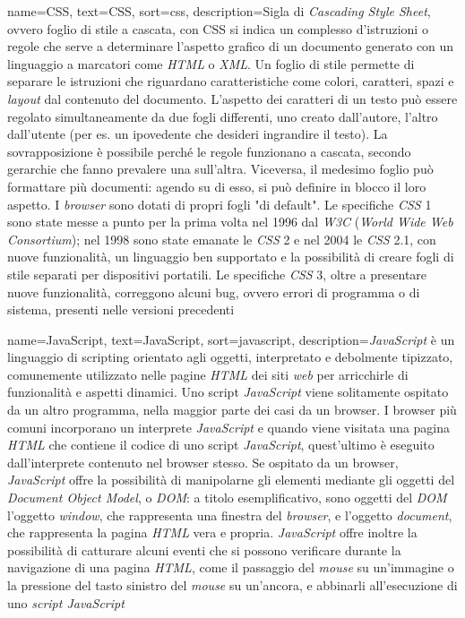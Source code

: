  {
    name=CSS,
    text=CSS,
    sort=css,
    description={Sigla di \emph{Cascading Style Sheet}, ovvero foglio di stile a cascata, con CSS si indica un complesso d'istruzioni o regole che serve a determinare l’aspetto grafico di un documento generato con un linguaggio a marcatori come \emph{HTML} o \emph{XML}. 
    Un foglio di stile permette di separare le istruzioni che riguardano caratteristiche come colori, caratteri, spazi e \emph{layout} dal contenuto del documento. 
    L’aspetto dei caratteri di un testo può essere regolato simultaneamente da due fogli differenti, uno creato dall’autore, l’altro dall’utente (per es. un ipovedente che desideri ingrandire il testo). 
    La sovrapposizione è possibile perché le regole funzionano a cascata, secondo gerarchie che fanno prevalere una sull’altra. 
    Viceversa, il medesimo foglio può formattare più documenti: agendo su di esso, si può definire in blocco il loro aspetto. 
    I \emph{browser} sono dotati di propri fogli "di default". 
    Le specifiche \emph{CSS} 1 sono state messe a punto per la prima volta nel 1996 dal \emph{W3C} (\emph{World Wide Web Consortium}); nel 1998 sono state emanate le \emph{CSS} 2 e nel 2004 le \emph{CSS} 2.1, con nuove funzionalità, un linguaggio ben supportato e la possibilità di creare fogli di stile separati per dispositivi portatili. 
    Le specifiche \emph{CSS} 3, oltre a presentare nuove funzionalità, correggono alcuni bug, ovvero errori di programma o di sistema, presenti nelle versioni precedenti}
}

 {
    name=JavaScript,
    text=JavaScript,
    sort=javascript,
    description={\emph{JavaScript} è un linguaggio di scripting orientato agli oggetti, interpretato e debolmente tipizzato, comunemente utilizzato nelle pagine \emph{HTML} dei siti \emph{web} per arricchirle di funzionalità e aspetti dinamici. 
    Uno script \emph{JavaScript} viene solitamente ospitato da un altro programma, nella maggior parte dei casi da un browser. 
    I browser più comuni incorporano un interprete \emph{JavaScript} e quando viene visitata una pagina \emph{HTML} che contiene il codice di uno script \emph{JavaScript}, quest'ultimo è eseguito dall’interprete contenuto nel browser stesso.  
    Se ospitato da un browser, \emph{JavaScript} offre la possibilità di manipolarne gli elementi mediante gli oggetti del \emph{Document Object Model}, o \emph{DOM}: a titolo esemplificativo, sono oggetti del \emph{DOM} l’oggetto \emph{window}, che rappresenta una finestra del \emph{browser}, e l’oggetto \emph{document}, che rappresenta la pagina \emph{HTML} vera e propria. 
    \emph{JavaScript} offre inoltre la possibilità di catturare alcuni eventi che si possono verificare durante la navigazione di una pagina \emph{HTML}, come il passaggio del \emph{mouse} su un’immagine o la pressione del tasto sinistro del \emph{mouse} su un’ancora, e abbinarli all’esecuzione di uno \emph{script JavaScript}}
}